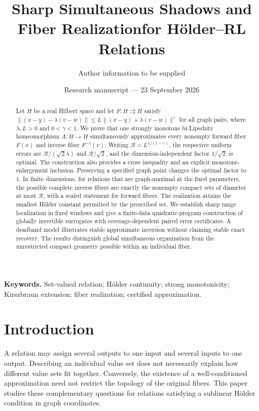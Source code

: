 \documentclass[11pt]{article}
\title{Sharp Simultaneous Shadows and Fiber Realization\newline for H\"older--RL Relations}
\author{Author information to be supplied}
\date{Research manuscript --- 23 September 2026}
\numberwithin{equation}{section}
\theoremstyle{definition}
\theoremstyle{remark}
\newcommand{\rad}{\mathcal R}
\newcommand{\norm}[1]{\lVert #1\rVert}
\begin{document}
\maketitle

\begin{abstract}
Let $H$ be a real Hilbert space and let $F:H\rightrightarrows H$ satisfy
$\norm{(x-y)-\lambda(v-w)}\le L\norm{(x-y)+\lambda(v-w)}^\gamma$
for all graph pairs, where $\lambda,L>0$ and $0<\gamma<1$.
We prove that one strongly monotone bi-Lipschitz homeomorphism
$A:H\to H$ simultaneously approximates every nonempty forward fiber
$F(x)$ and inverse fiber $F^{-1}(v)$. Writing
$\rad=L^{1/(1-\gamma)}$, the respective uniform errors are
$\rad/(\sqrt2\lambda)$ and $\rad/\sqrt2$, and the
dimension-independent factor $1/\sqrt2$ is optimal. The construction
also provides a cross inequality and an explicit monotone-enlargement
inclusion. Preserving a specified graph point changes the optimal factor
to $1$. In finite dimensions, for relations that are graph-maximal at the
fixed parameters, the possible complete inverse fibers are exactly the
nonempty compact sets of diameter at most $\rad$, with a scaled statement
for forward fibers. The realization attains the smallest H\"older constant
permitted by the prescribed set. We establish sharp range localization
in fixed windows and give a finite-data quadratic-program construction
of globally invertible surrogates with coverage-dependent paired error
certificates. A deadband model illustrates stable approximate inversion
without claiming stable exact recovery. The results distinguish global
simultaneous organization from the unrestricted compact geometry possible
within an individual fiber.
\end{abstract}

\noindent\textbf{Keywords.} Set-valued relation; H\"older continuity; strong
monotonicity; Kirszbraun extension; fiber realization; certified approximation.

\tableofcontents

\section{Introduction}\label{sec:intro}

A relation may assign several outputs to one input and several inputs to
one output. Describing an individual value set does not necessarily explain
how different value sets fit together. Conversely, the existence of a
well-conditioned approximation need not restrict the topology of the
original fibers. This paper studies these complementary questions for
relations satisfying a sublinear H\"older condition in graph coordinates.
\end{document}
